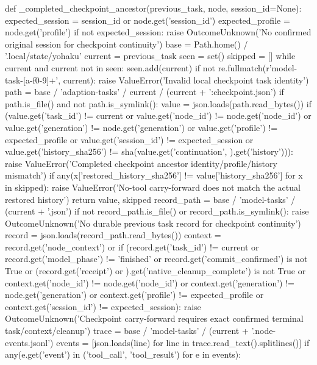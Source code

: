 {def _completed_checkpoint_ancestor(previous_task, node, session_id=None):
    expected_session = session_id or node.get('session_id')
    expected_profile = node.get('profile')
    if not expected_session:
        raise OutcomeUnknown('No confirmed original session for checkpoint continuity')
    base = Path.home() / '.local/state/yohaku'
    current = previous_task
    seen = set()
    skipped = []
    while current and current not in seen:
        seen.add(current)
        if not re.fullmatch(r'model-task-[a-f0-9]+', current):
            raise ValueError('Invalid local checkpoint task identity')
        path = base / 'adaption-tasks' / current / (current + ':checkpoint.json')
        if path.is_file() and not path.is_symlink():
            value = json.loads(path.read_bytes())
            if (value.get('task_id') != current or value.get('node_id') != node.get('node_id')
                    or value.get('generation') != node.get('generation') or value.get('profile') != expected_profile
                    or value.get('session_id') != expected_session
                    or value.get('history_sha256') != sha(value.get('continuation', {}).get('history'))):
                raise ValueError('Completed checkpoint ancestor identity/profile/history mismatch')
            if any(x['restored_history_sha256'] != value['history_sha256'] for x in skipped):
                raise ValueError('No-tool carry-forward does not match the actual restored history')
            return value, skipped
        record_path = base / 'model-tasks' / (current + '.json')
        if not record_path.is_file() or record_path.is_symlink():
            raise OutcomeUnknown('No durable previous task record for checkpoint continuity')
        record = json.loads(record_path.read_bytes())
        context = record.get('node_context') or {}
        if (record.get('task_id') != current or record.get('model_phase') != 'finished'
                or record.get('commit_confirmed') is not True
                or (record.get('receipt') or {}).get('native_cleanup_complete') is not True
                or context.get('node_id') != node.get('node_id') or context.get('generation') != node.get('generation')
                or context.get('profile') != expected_profile or context.get('session_id') != expected_session):
            raise OutcomeUnknown('Checkpoint carry-forward requires exact confirmed terminal task/context/cleanup')
        trace = base / 'model-tasks' / (current + '.node-events.jsonl')
        events = [json.loads(line) for line in trace.read_text().splitlines()]
        if any(e.get('event') in ('tool_call', 'tool_result') for e in events):
}

